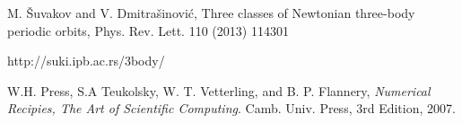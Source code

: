 \documentclass[12pt]{article}
\begin{document}
\begin{thebibliography}{9}

    M. Šuvakov and V. Dmitrašinović, Three classes of Newtonian three-body periodic orbits, Phys. Rev. Lett. 110 (2013) 114301

    http://suki.ipb.ac.rs/3body/

  W.H. Press, S.A Teukolsky, W. T. Vetterling, and B. P. Flannery,
  \emph{Numerical Recipies, The Art of Scientific Computing}.
  Camb. Univ. Press,
  3rd Edition,
  2007.

\end{thebibliography}
\end{document}
